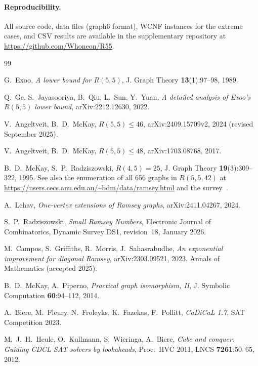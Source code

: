 \documentclass[11pt,a4paper]{article}
\theoremstyle{definition}
\theoremstyle{remark}
\newcommand{\Rset}[3]{R(#1,#2,#3)}
\begin{document}
\paragraph{Reproducibility.}
All source code, data files (graph6 format), WCNF instances
for the extreme cases, and CSV results are available in the
supplementary repository at
\url{https://github.com/Whoneon/R55}.


\begin{thebibliography}{99}

G.~Exoo,
\emph{A lower bound for $R(5,5)$},
J. Graph Theory \textbf{13}(1):97--98, 1989.

Q.~Ge, S.~Jayasooriya, B.~Qiu, L.~Sun, Y.~Yuan,
\emph{A detailed analysis of Exoo's $R(5,5)$ lower bound},
arXiv:2212.12630, 2022.

V.~Angeltveit, B.~D.~McKay,
\emph{$R(5,5) \leq 46$},
arXiv:2409.15709v2, 2024 (revised September 2025).

V.~Angeltveit, B.~D.~McKay,
\emph{$R(5,5) \leq 48$},
arXiv:1703.08768, 2017.

B.~D.~McKay, S.~P.~Radziszowski,
\emph{$R(4,5) = 25$},
J. Graph Theory \textbf{19}(3):309--322, 1995.
See also the enumeration of all 656 graphs in $\Rset{5}{5}{42}$
at \url{https://users.cecs.anu.edu.au/~bdm/data/ramsey.html}
and the survey~\cite{Radziszowski2021}.

A.~Lehav,
\emph{One-vertex extensions of Ramsey graphs},
arXiv:2411.04267, 2024.

S.~P.~Radziszowski,
\emph{Small Ramsey Numbers},
Electronic Journal of Combinatorics, Dynamic Survey DS1,
revision~18, January 2026.

M.~Campos, S.~Griffiths, R.~Morris, J.~Sahasrabudhe,
\emph{An exponential improvement for diagonal Ramsey},
arXiv:2303.09521, 2023.
Annals of Mathematics (accepted 2025).

B.~D.~McKay, A.~Piperno,
\emph{Practical graph isomorphism, {II}},
J. Symbolic Computation \textbf{60}:94--112, 2014.

A.~Biere, M.~Fleury, N.~Froleyks, K.~Fazekas, F.~Pollitt,
\emph{{CaDiCaL} 1.7},
SAT Competition 2023.

M.~J.~H.~Heule, O.~Kullmann, S.~Wieringa, A.~Biere,
\emph{Cube and conquer: Guiding CDCL SAT solvers by lookaheads},
Proc.\ HVC 2011, LNCS \textbf{7261}:50--65, 2012.


\end{thebibliography}
\end{document}
